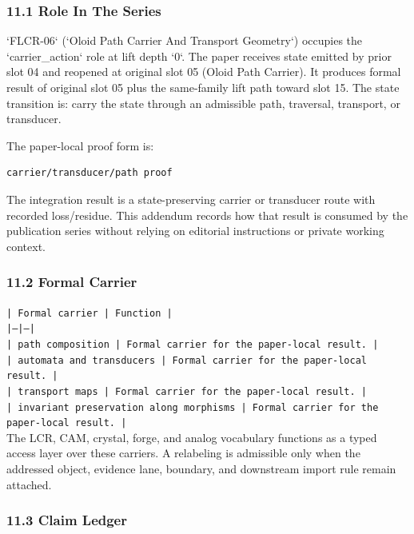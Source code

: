 \documentclass[11pt]{article}
\begin{document}
\subsubsection*{11.1 Role In The Series}

`FLCR-06` (`Oloid Path Carrier And Transport Geometry`) occupies the `carrier\_action` role at lift depth `0`.
The paper receives state emitted by prior slot 04 and reopened at original slot 05 (Oloid Path Carrier). It produces formal result of original slot 05 plus the same-family lift path toward slot 15. The state transition is:
carry the state through an admissible path, traversal, transport, or transducer.

The paper-local proof form is:

\begin{verbatim}
carrier/transducer/path proof
\end{verbatim}

The integration result is a state-preserving carrier or transducer route with recorded loss/residue. This addendum records how that result is
consumed by the publication series without relying on editorial instructions or
private working context.

\subsubsection*{11.2 Formal Carrier}

\noindent\texttt{| Formal carrier | Function |}\\
\noindent\texttt{|---|---|}\\
\noindent\texttt{| path composition | Formal carrier for the paper-local result. |}\\
\noindent\texttt{| automata and transducers | Formal carrier for the paper-local result. |}\\
\noindent\texttt{| transport maps | Formal carrier for the paper-local result. |}\\
\noindent\texttt{| invariant preservation along morphisms | Formal carrier for the paper-local result. |}\\

The LCR, CAM, crystal, forge, and analog vocabulary functions as a typed access
layer over these carriers. A relabeling is admissible only when the addressed
object, evidence lane, boundary, and downstream import rule remain attached.

\subsubsection*{11.3 Claim Ledger}
\end{document}
